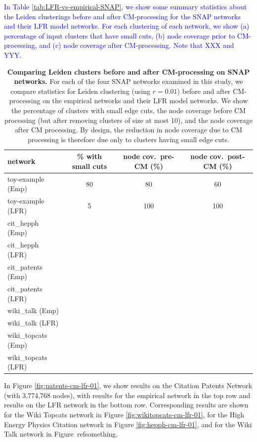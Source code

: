 \documentclass[11pt]{article}   	%
\begin{document}
\textcolor{blue}{In Table \ref{tab:LFR-vs-empirical-SNAP}, we show some summary statistics about the  Leiden clusterings before and after CM-processing for the SNAP networks and their LFR model networks.  For each clustering of each network, we  show (a) percentage of input clusters that have small cuts, (b) node coverage prior to CM-processing, and (c) node coverage after CM-processing.  Note that 
XXX and YYY.}


\begin{table}[ht]
\centering
\begin{tabular}{lccc}
  \hline
 network & \% with small cuts & node cov.~pre-CM (\%) & node cov.~post-CM (\%) \\
  \hline
  toy-example (Emp) & 80 & 80 & 60 \\
  toy-example (LFR) & 5 & 100 & 100 \\
  \hline
  cit\_hepph (Emp) &  && \\
  cit\_hepph (LFR) &  && \\
  \hline
  cit\_patents (Emp) & && \\
    cit\_patents  (LFR) & && \\
  \hline
  wiki\_talk (Emp) & && \\
    wiki\_talk (LFR) & && \\
  \hline
  wiki\_topcats  (Emp)& && \\
   wiki\_topcats  (LFR)& && \\
   \hline
\end{tabular}
\caption{\textbf{Comparing Leiden clusters before and after CM-processing  on SNAP networks.} For each of the four SNAP networks 
examined in this study, we compare statistics for Leiden clustering (using $r=0.01$) before and after CM-processing on the empirical networks and their LFR model
networks. We show the percentage of clusters with small edge cuts, the node coverage before CM processing (but after removing clusters of size at most 10), and the node coverage
after CM processing.  By design, the reduction in node coverage due to CM processing  is therefore due only to clusters having small edge cuts.}
\label{tab:LFR-vs-empirica-SNAPl}
\end{table}



In Figure \ref{fig:patents-cm-lfr-01}, we show results on the Citation Patents Network  (with 3,774,768 nodes), with results for the
empirical  network in the top row and results on the LFR network in the bottom row.  
Corresponding results are shown for the Wiki Topcats network in Figure \ref{fig:wikitopcats-cm-lfr-01}, for the High Energy Physics Citation network 
in Figure \ref{fig:hepph-cm-lfr-01}, and for the Wiki Talk network in Figure\ ref{something}.
\end{document}
